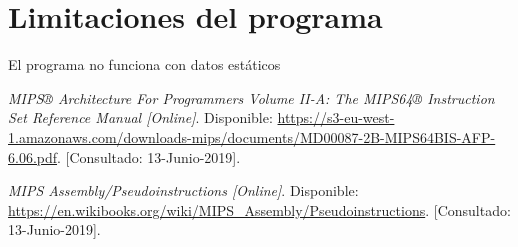 \documentclass{article}
\begin{document}
\section{Limitaciones del programa}

El programa no funciona con datos estáticos 

 \begin{thebibliography}{1}
	\textit{MIPS® Architecture For Programmers Volume II-A: The MIPS64® Instruction Set Reference Manual [Online]}. Disponible:
	\url{https://s3-eu-west-1.amazonaws.com/downloads-mips/documents/MD00087-2B-MIPS64BIS-AFP-6.06.pdf}.
	[Consultado: 13-Junio-2019].

	\textit{MIPS Assembly/Pseudoinstructions [Online]}. Disponible:
	\url{https://en.wikibooks.org/wiki/MIPS_Assembly/Pseudoinstructions}.
	[Consultado: 13-Junio-2019].

\end{thebibliography}
\end{document}
